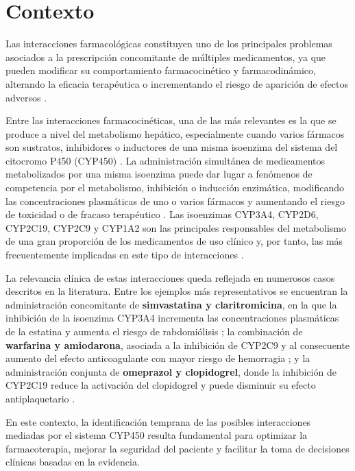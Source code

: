 
\section{Contexto}
Las interacciones farmacológicas constituyen uno de los principales problemas asociados a la prescripción 
concomitante de múltiples medicamentos, ya que pueden modificar su comportamiento farmacocinético y 
farmacodinámico, alterando la eficacia terapéutica o incrementando el riesgo de aparición de efectos adversos \cite{rodrigues2016drug}.

Entre las interacciones farmacocinéticas, una de las más relevantes es la que se produce a nivel del metabolismo 
hepático, especialmente cuando varios fármacos son sustratos, inhibidores o inductores de una misma isoenzima del 
sistema del citocromo P450 (CYP450) \cite{flockhart2021table}. La administración simultánea de medicamentos metabolizados por una misma 
isoenzima puede dar lugar a fenómenos de competencia por el metabolismo, inhibición o inducción enzimática, 
modificando las concentraciones plasmáticas de uno o varios fármacos y aumentando el riesgo de toxicidad o de 
fracaso terapéutico \cite{denisov2015mechanism} \cite{guengerich2008cytochrome}. Las isoenzimas CYP3A4, CYP2D6, CYP2C19, CYP2C9 y CYP1A2 son las principales responsables del 
metabolismo de una gran proporción de los medicamentos de uso clínico y, por tanto, las más frecuentemente 
implicadas en este tipo de interacciones \cite{zanger2013cytochrome}.

La relevancia clínica de estas interacciones queda reflejada en numerosos casos descritos en la literatura. 
Entre los ejemplos más representativos se encuentran la administración concomitante de \textbf{simvastatina y claritromicina}, 
en la que la inhibición de la isoenzima CYP3A4 incrementa las concentraciones plasmáticas de la estatina y aumenta 
el riesgo de rabdomiólisis \cite{zhou2007clinically} \cite{deodhar2020mechanisms}; la combinación de \textbf{warfarina y amiodarona}, asociada a la inhibición de CYP2C9 y al 
consecuente aumento del efecto anticoagulante con mayor riesgo de hemorragia \cite{lee2024review} \cite{deodhar2020mechanisms}; y la administración conjunta de 
\textbf{omeprazol y clopidogrel}, donde la inhibición de CYP2C19 reduce la activación del clopidogrel y puede disminuir 
su efecto antiplaquetario \cite{lee2024review}.

En este contexto, la identificación temprana de las posibles interacciones mediadas por el sistema CYP450 resulta 
fundamental para optimizar la farmacoterapia, mejorar la seguridad del paciente y facilitar la toma de decisiones 
clínicas basadas en la evidencia.


